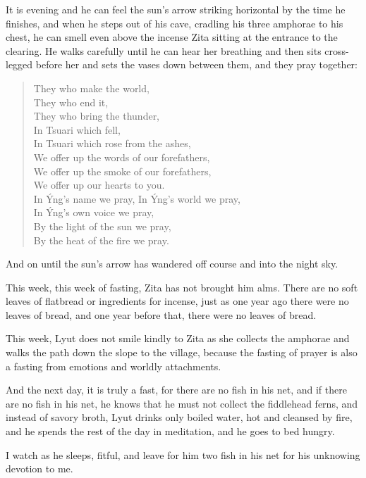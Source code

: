 It is evening and he can feel the sun's arrow striking horizontal by the time he finishes, and when he steps out of his cave, cradling his three amphorae to his chest, he can smell even above the incense Zita sitting at the entrance to the clearing. He walks carefully until he can hear her breathing and then sits cross-legged before her and sets the vases down between them, and they pray together:

\begin{verse}
They who make the world, \\
They who end it, \\
They who bring the thunder, \\
In Tsuari which fell, \\
In Tsuari which rose from the ashes, \\
We offer up the words of our forefathers, \\
We offer up the smoke of our forefathers, \\
We offer up our hearts to you. \\
In Ýng's name we pray, In Ýng's world we pray, \\
In Ýng's own voice we pray, \\
By the light of the sun we pray, \\
By the heat of the fire we pray.
\end{verse}

And on until the sun's arrow has wandered off course and into the night sky.

This week, this week of fasting, Zita has not brought him alms. There are no soft leaves of flatbread or ingredients for incense, just as one year ago there were no leaves of bread, and one year before that, there were no leaves of bread.

This week, Lyut does not smile kindly to Zita as she collects the amphorae and walks the path down the slope to the village, because the fasting of prayer is also a fasting from emotions and worldly attachments.

And the next day, it is truly a fast, for there are no fish in his net, and if there are no fish in his net, he knows that he must not collect the fiddlehead ferns, and instead of savory broth, Lyut drinks only boiled water, hot and cleansed by fire, and he spends the rest of the day in meditation, and he goes to bed hungry.

I watch as he sleeps, fitful, and leave for him two fish in his net for his unknowing devotion to me.


